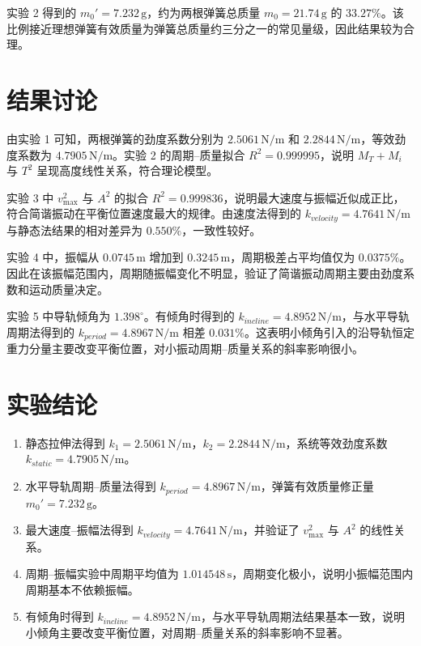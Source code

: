 \documentclass[UTF8,zihao=-4]{ctexart}
\begin{document}
实验 2 得到的 $m_0'=7.232\,\mathrm{g}$，约为两根弹簧总质量 $m_0=21.74\,\mathrm{g}$ 的 $33.27\%$。该比例接近理想弹簧有效质量为弹簧总质量约三分之一的常见量级，因此结果较为合理。

\section{结果讨论}
由实验 1 可知，两根弹簧的劲度系数分别为 $2.5061\,\mathrm{N/m}$ 和 $2.2844\,\mathrm{N/m}$，等效劲度系数为 $4.7905\,\mathrm{N/m}$。实验 2 的周期--质量拟合 $R^2=0.999995$，说明 $M_T+M_i$ 与 $T^2$ 呈现高度线性关系，符合理论模型。

实验 3 中 $v_{\max}^2$ 与 $A^2$ 的拟合 $R^2=0.999836$，说明最大速度与振幅近似成正比，符合简谐振动在平衡位置速度最大的规律。由速度法得到的 $k_{velocity}=4.7641\,\mathrm{N/m}$ 与静态法结果的相对差异为 $0.550\%$，一致性较好。

实验 4 中，振幅从 $0.0745\,\mathrm{m}$ 增加到 $0.3245\,\mathrm{m}$，周期极差占平均值仅为 $0.0375\%$。因此在该振幅范围内，周期随振幅变化不明显，验证了简谐振动周期主要由劲度系数和运动质量决定。

实验 5 中导轨倾角为 $1.398^\circ$。有倾角时得到的 $k_{incline}=4.8952\,\mathrm{N/m}$，与水平导轨周期法得到的 $k_{period}=4.8967\,\mathrm{N/m}$ 相差 $0.031\%$。这表明小倾角引入的沿导轨恒定重力分量主要改变平衡位置，对小振动周期--质量关系的斜率影响很小。

\section{实验结论}
\begin{enumerate}[leftmargin=3em]
  \item 静态拉伸法得到 $k_1=2.5061\,\mathrm{N/m}$，$k_2=2.2844\,\mathrm{N/m}$，系统等效劲度系数 $k_{static}=4.7905\,\mathrm{N/m}$。
  \item 水平导轨周期--质量法得到 $k_{period}=4.8967\,\mathrm{N/m}$，弹簧有效质量修正量 $m_0'=7.232\,\mathrm{g}$。
  \item 最大速度--振幅法得到 $k_{velocity}=4.7641\,\mathrm{N/m}$，并验证了 $v_{\max}^2$ 与 $A^2$ 的线性关系。
  \item 周期--振幅实验中周期平均值为 $1.014548\,\mathrm{s}$，周期变化极小，说明小振幅范围内周期基本不依赖振幅。
  \item 有倾角时得到 $k_{incline}=4.8952\,\mathrm{N/m}$，与水平导轨周期法结果基本一致，说明小倾角主要改变平衡位置，对周期--质量关系的斜率影响不显著。
\end{enumerate}
\end{document}
